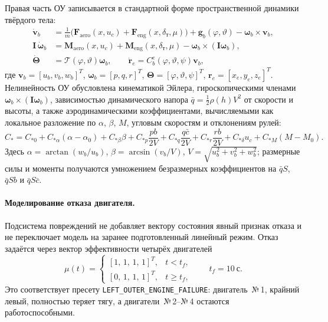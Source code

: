 \documentclass[a4paper,14pt]{extarticle}
\newcommand{\dt}{\delta_{\text{т}}}
\begin{document}
Правая часть ОУ записывается в стандартной форме пространственной динамики твёрдого тела:
\begin{align}
\dot{\boldsymbol v}_b &= \frac{1}{m}\bigl(\boldsymbol F_{\text{aero}}(x,u_c)+\boldsymbol F_{\text{eng}}(x,\dt,\mu)\bigr)
    + \boldsymbol g_b(\varphi,\vartheta) - \boldsymbol\omega_b\times \boldsymbol v_b, \\
\mathbf I\,\dot{\boldsymbol\omega}_b &=
    \boldsymbol M_{\text{aero}}(x,u_c)+\boldsymbol M_{\text{eng}}(x,\dt,\mu)
    - \boldsymbol\omega_b\times(\mathbf I\boldsymbol\omega_b), \\
\dot{\boldsymbol\Theta} &= \mathcal T(\varphi,\vartheta)\boldsymbol\omega_b,\qquad
\dot{\boldsymbol r}_e = C_b^e(\varphi,\vartheta,\psi)\boldsymbol v_b,
\label{eq:b747-6dof}
\end{align}
где $\boldsymbol v_b=[u_b,v_b,w_b]^T$, $\boldsymbol\omega_b=[p,q,r]^T$, $\boldsymbol\Theta=[\varphi,\vartheta,\psi]^T$, $\boldsymbol r_e=[x_e,y_e,z_e]^T$. Нелинейность ОУ обусловлена кинематикой Эйлера, гироскопическими членами $\boldsymbol\omega_b\times(\mathbf I\boldsymbol\omega_b)$, зависимостью динамического напора $\bar q=\frac{1}{2}\rho(h)V^2$ от скорости и высоты, а также аэродинамическими коэффициентами, вычисляемыми как локальное разложение по $\alpha$, $\beta$, $M$, угловым скоростям и отклонениям рулей:
\begin{equation}
C_\ast = C_{\ast 0}
+ C_{\ast \alpha}(\alpha-\alpha_0)
+ C_{\ast \beta}\beta
+ C_{\ast p}\frac{pb}{2V}
+ C_{\ast q}\frac{q\bar c}{2V}
+ C_{\ast r}\frac{rb}{2V}
+ C_{\ast \delta}u_c
+ C_{\ast M}(M-M_0).
\label{eq:b747-aero-build}
\end{equation}
Здесь $\alpha=\arctan(w_b/u_b)$, $\beta=\arcsin(v_b/V)$, $V=\sqrt{u_b^2+v_b^2+w_b^2}$; размерные силы и моменты получаются умножением безразмерных коэффициентов на $\bar q S$, $\bar q S b$ и $\bar q S\bar c$.

\paragraph{Моделирование отказа двигателя.} Подсистема повреждений не добавляет вектору состояния явный признак отказа и не переключает модель на заранее подготовленный линейный режим. Отказ задаётся через вектор эффективности четырёх двигателей
\begin{equation}
\mu(t)=
\begin{cases}
[1,\,1,\,1,\,1]^T, & t < t_f,\\
[0,\,1,\,1,\,1]^T, & t \ge t_f,
\end{cases}
\qquad t_f=10~\text{с}.
\label{eq:b747-engine-failure}
\end{equation}
Это соответствует пресету \texttt{LEFT\_OUTER\_ENGINE\_FAILURE}: двигатель~№\,1, крайний левый, полностью теряет тягу, а двигатели~№\,2--№\,4 остаются работоспособными.
\end{document}
